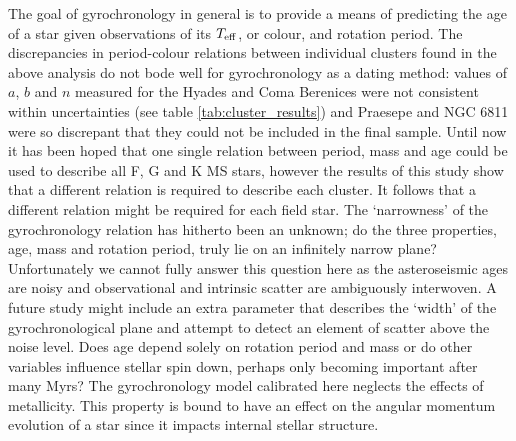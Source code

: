 \documentclass[11pt,preprint]{aastex}
\newcommand{\teff}{$T_{\rm{eff}}$}
\begin{document}

The goal of gyrochronology in general is to provide a means of predicting the
age of a star given observations of its \teff, or colour, and rotation period.
The discrepancies in period-colour relations between individual clusters found
in the above analysis do not bode well for gyrochronology as a dating method:
values of $a$, $b$ and $n$ measured for the Hyades and Coma Berenices were not
consistent within uncertainties (see table \ref{tab:cluster_results}) and
Praesepe and NGC 6811 were so discrepant that they could not be included in
the final sample.
Until now it has been hoped that one single relation between period, mass and
age could be used to describe all F, G and K MS stars, however the results of
this study show that a different relation is required to describe each
cluster.
It follows that a different relation might be required for each field star.
The `narrowness' of the gyrochronology relation has hitherto been an unknown;
do the three properties, age, mass and rotation period, truly lie on an
infinitely narrow plane?
Unfortunately we cannot fully answer this question here as the asteroseismic
ages are noisy and observational and intrinsic scatter are ambiguously
interwoven.
A future study might include an extra parameter that describes the `width' of
the gyrochronological plane and attempt to detect an element of scatter above
the noise level.
Does age depend solely on rotation period and mass or do other variables
influence stellar spin down, perhaps only becoming important after many Myrs?
The gyrochronology model calibrated here neglects the effects of metallicity.
This property is bound to have an effect on the angular momentum evolution
of a star since it impacts internal stellar structure.
\end{document}
